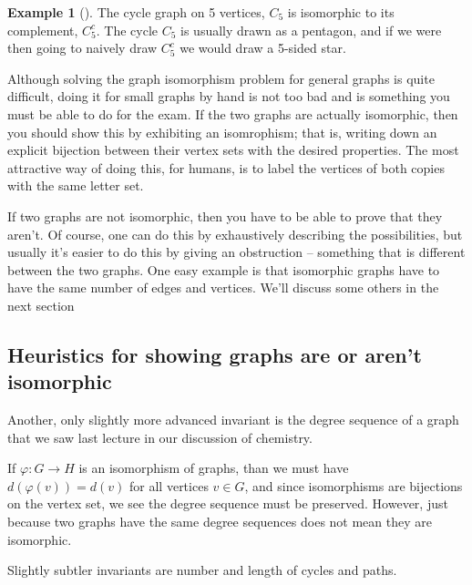 \documentclass[10pt,]{book}
\theoremstyle{plain}
\theoremstyle{definition}
\theoremstyle{definition}
\newtheorem{example}[theorem]{Example}
\theoremstyle{definition}
\begin{document}
\begin{example}[]\label{example-8}
\hypertarget{p-42}{}%
The cycle graph on 5 vertices, \(C_5\) is isomorphic to its complement, \(C_5^c\).  The cycle \(C_5\) is usually drawn as a pentagon, and if we were then going to naively draw \(C_5^c\) we would draw a 5-sided star.%
\end{example}
\hypertarget{p-43}{}%
Although solving the graph isomorphism problem for general graphs is quite difficult, doing it for small graphs by hand is not too bad and is something you must be able to do for the exam.  If the two graphs are actually isomorphic, then you should show this by exhibiting an isomrophism; that is, writing down an explicit bijection between their vertex sets with the desired properties. The most attractive way of doing this, for humans, is to label the vertices of both copies with the same letter set.%
\par
\hypertarget{p-44}{}%
If two graphs are not isomorphic, then you have to be able to prove that they aren't. Of course, one can do this by exhaustively describing the possibilities, but usually it's easier to do this by giving an obstruction – something that is different between the two graphs. One easy example is that isomorphic graphs have to have the same number of edges and vertices. We'll discuss some others in the next section%
\typeout{************************************************}
\typeout{************************************************}
\subsection[{Heuristics for showing graphs are or aren't isomorphic}]{Heuristics for showing graphs are or aren't isomorphic}\label{subsection-8}
\hypertarget{p-45}{}%
Another, only slightly more advanced invariant is the degree sequence of a graph that we saw last lecture in our discussion of chemistry.%
\par
\hypertarget{p-46}{}%
If \(\varphi:G\to H\) is an isomorphism of graphs, than we must have \(d(\varphi(v))=d(v)\) for all vertices \(v\in G\), and since isomorphisms are bijections on the vertex set, we see the degree sequence must be preserved.  However, just because two graphs have the same degree sequences does not mean they are isomorphic.%
\par
\hypertarget{p-47}{}%
Slightly subtler invariants are number and length of cycles and paths.%
\typeout{************************************************}
\typeout{************************************************}
\end{document}
